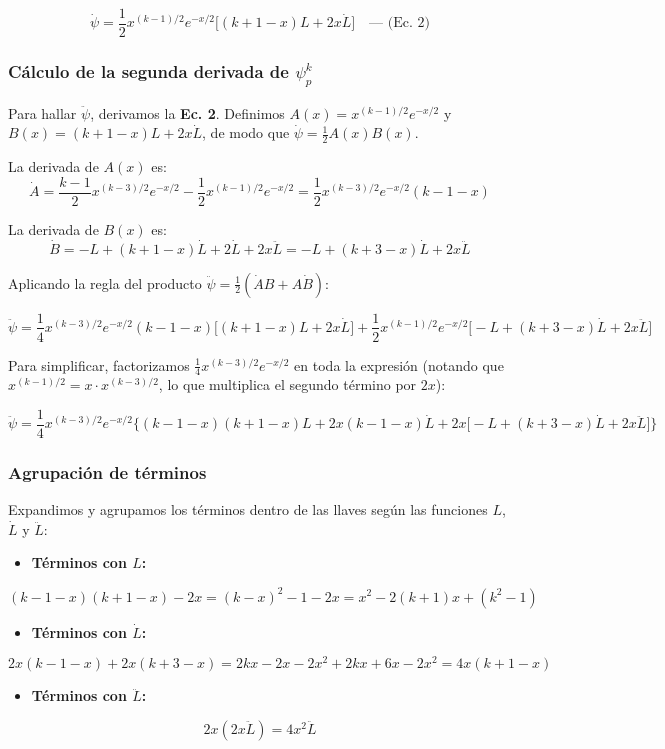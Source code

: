 \documentclass[a4paper]{article}
\begin{document}
\[
\dot{\psi} = \frac{1}{2} x^{(k-1)/2} e^{-x/2} \Big[ (k+1-x)L + 2x\dot{L} \Big] \quad \text{--- (Ec. 2)}
\]

\subsubsection[Cálculo de la segunda derivada de psi]{Cálculo de la segunda derivada de $\psi_p^k$}

Para hallar $\ddot{\psi}$, derivamos la \textbf{Ec. 2}. Definimos $A(x) = x^{(k-1)/2} e^{-x/2}$ y $B(x) = (k+1-x)L + 2x\dot{L}$, de modo que $\dot{\psi} = \frac{1}{2} A(x) B(x)$.

La derivada de $A(x)$ es:
\[
\dot{A} = \frac{k-1}{2} x^{(k-3)/2} e^{-x/2} - \frac{1}{2} x^{(k-1)/2} e^{-x/2} = \frac{1}{2} x^{(k-3)/2} e^{-x/2} (k-1-x)
\]

La derivada de $B(x)$ es:
\[
\dot{B} = -L + (k+1-x)\dot{L} + 2\dot{L} + 2x\ddot{L} = -L + (k+3-x)\dot{L} + 2x\ddot{L}
\]

Aplicando la regla del producto $\ddot{\psi} = \frac{1}{2}(\dot{A}B + A\dot{B})$:

\[
\ddot{\psi} = \frac{1}{4} x^{(k-3)/2} e^{-x/2} (k-1-x) \Big[ (k+1-x)L + 2x\dot{L} \Big] + \frac{1}{2} x^{(k-1)/2} e^{-x/2} \Big[ -L + (k+3-x)\dot{L} + 2x\ddot{L} \Big]
\]

Para simplificar, factorizamos $\frac{1}{4} x^{(k-3)/2} e^{-x/2}$ en toda la expresión (notando que $x^{(k-1)/2} = x \cdot x^{(k-3)/2}$, lo que multiplica el segundo término por $2x$):

\[
\ddot{\psi} = \frac{1}{4} x^{(k-3)/2} e^{-x/2} \Big\{ (k-1-x)(k+1-x)L + 2x(k-1-x)\dot{L} + 2x \big[ -L + (k+3-x)\dot{L} + 2x\ddot{L} \big] \Big\}
\]

\subsubsection{Agrupación de términos}

Expandimos y agrupamos los términos dentro de las llaves según las funciones $L$, $\dot{L}$ y $\ddot{L}$:

\begin{itemize}
\item \textbf{Términos con $L$:}
\end{itemize}
\[
(k-1-x)(k+1-x) - 2x = (k-x)^2 - 1 - 2x = x^2 - 2(k+1)x + (k^2 - 1)
\]
\begin{itemize}
\item \textbf{Términos con $\dot{L}$:}
\end{itemize}
\[
2x(k-1-x) + 2x(k+3-x) = 2kx - 2x - 2x^2 + 2kx + 6x - 2x^2 = 4x(k+1-x)
\]
\begin{itemize}
\item \textbf{Términos con $\ddot{L}$:}
\end{itemize}
\[
2x(2x\ddot{L}) = 4x^2\ddot{L}
\]
\end{document}
